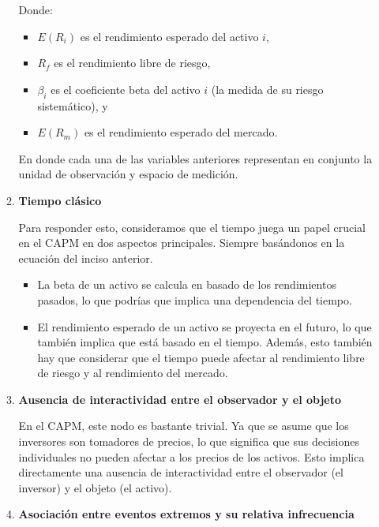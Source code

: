 \begin{problema}
\begin{sol}
\begin{itemize}
\begin{enumerate}
        Donde:
        \begin{itemize}
        \item $E(R_i)$ es el rendimiento esperado del activo $i$,
        \item $R_f$ es el rendimiento libre de riesgo,
        \item $\beta_i$ es el coeficiente beta del activo $i$ (la medida de su riesgo sistemático), y
        \item $E(R_m)$ es el rendimiento esperado del mercado.
        \end{itemize}
        
        En donde cada una de las variables anteriores representan en conjunto la unidad de observación y espacio de medición. 
        
        \item \textbf{Tiempo clásico}
        
       Para responder esto, consideramos que el tiempo juega un papel crucial en el CAPM en dos aspectos principales. Siempre basándonos en la ecuación del inciso anterior. 

       \begin{itemize}
        \item La beta de un activo se calcula en basado de los rendimientos pasados, lo que podrías que implica una dependencia del tiempo.
        \item El rendimiento esperado de un activo se proyecta en el futuro, lo que también implica que está basado en el tiempo. Además, esto también hay que considerar  que el tiempo puede afectar al rendimiento libre de riesgo y al rendimiento del mercado.
       \end{itemize}
       
       
        \item \textbf{Ausencia de interactividad entre el observador y el objeto}
        
        En el CAPM, este nodo es bastante trivial. Ya que se asume que los inversores son tomadores de precios, lo que significa que sus decisiones individuales no pueden afectar a los precios de los activos. Esto implica directamente una ausencia de interactividad entre el observador (el inversor) y el objeto (el activo).
        
        \item \textbf{Asociación entre eventos extremos y su relativa infrecuencia}
        

\end{enumerate}
\end{itemize}
\end{sol}
\end{problema}
